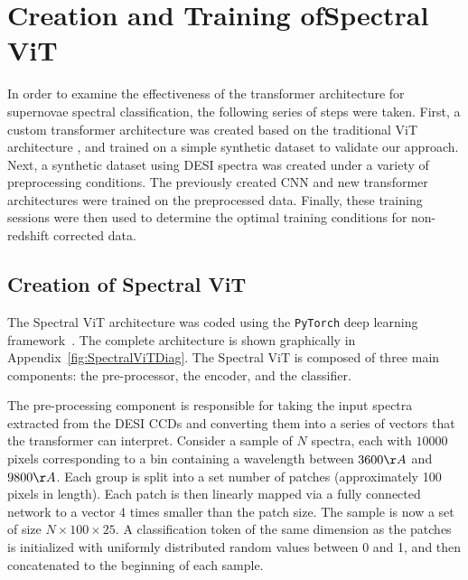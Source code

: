 \chapter[Creation and Training of Spectral ViT]{Creation and Training of\newline Spectral ViT}
\label{chap:methods}

In order to examine the effectiveness of the transformer architecture for supernovae
spectral classification, the following series of steps were taken. First, a custom transformer 
architecture was created based on the traditional ViT architecture \parencite{dosovitskiy2020}, 
and trained on a simple synthetic dataset to validate our approach. Next, a synthetic dataset 
using DESI spectra was created under a variety of preprocessing conditions. The previously 
created CNN and new transformer architectures were trained on the
preprocessed data. Finally, these training sessions were then used to determine 
the optimal training conditions for non-redshift corrected data. 

\section{Creation of Spectral ViT}\label{sec:SpecViT}
The Spectral ViT architecture was coded using the \texttt{PyTorch}
deep learning framework~\parencite{PyTorch2019}. The complete architecture is shown graphically in
Appendix~\ref{fig:SpectralViTDiag}. The Spectral ViT is composed of three main components:
the pre-processor, the encoder, and the classifier. 

The pre-processing component is responsible for taking the 
input spectra extracted from the DESI CCDs and converting them into a series of 
vectors that the transformer can interpret. 
Consider a sample of $N$ spectra, each with $10000$ pixels corresponding to a bin containing a wavelength 
between $3600\AA$ and $9800\AA$. Each group is split into a set number of patches 
(approximately 100 pixels in length). Each patch is then 
linearly mapped via a fully connected network to a vector 4 times smaller than the patch size.
The sample is now a set of size $N\times100\times25$. A classification token of the same dimension as the patches 
is initialized with uniformly distributed random values between 0 and 1, and then concatenated to the beginning of each sample.

